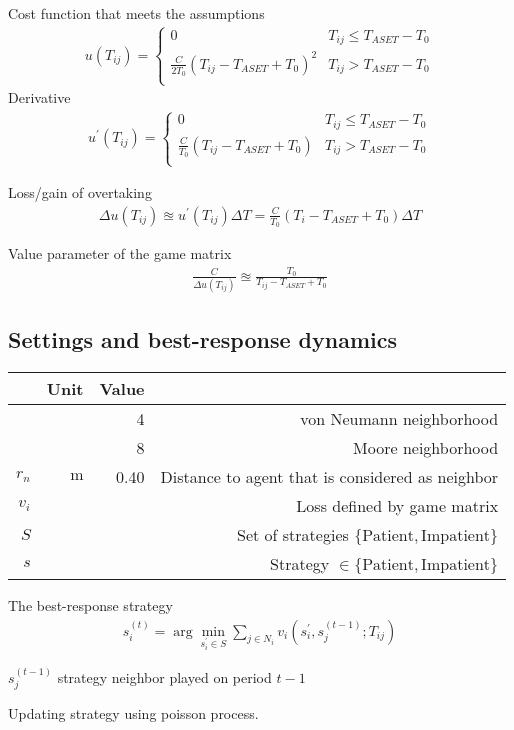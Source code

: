 Cost function that meets the assumptions
\begin{align}
u(T_{ij}) = \begin{cases}
0 & T_{ij} \leq T_{ASET} - T_{0} \\
\frac{C}{2 T_{0}} \left(T_{ij} - T_{ASET} + T_{0}\right)^{2} & T_{ij} > T_{ASET} - T_{0} \\
\end{cases}
\end{align}
Derivative
\begin{align}
u^{\prime}(T_{ij}) = \begin{cases}
0 & T_{ij} \leq T_{ASET} - T_{0} \\
\frac{C}{T_{0}} \left(T_{ij} - T_{ASET} + T_{0}\right) & T_{ij} > T_{ASET} - T_{0} \\
\end{cases}
\end{align}

Loss/gain of overtaking
\begin{align}
\Delta u(T_{ij}) \approxeq u^{\prime}(T_{ij}) \Delta T = \frac{C}{T_{0}} \left(T_{i} - T_{ASET} + T_{0}\right) \Delta T
\end{align}

Value parameter of the game matrix
\begin{align}
\frac{C}{\Delta u(T_{ij})} \approxeq \frac{T_{0}}{T_{ij} - T_{ASET} + T_{0}}
\end{align}

\subsection{Settings and best-response dynamics}
\begin{table}[H]
\begin{tabularx}{1.0\linewidth}{ r r r R }
 & Unit & Value &  \\
\hline
\hline
 & & 4 & von Neumann neighborhood \\
 & & 8 & Moore neighborhood \\
$ r_{n} $ & $ \mathrm{m} $ & 0.40 & Distance to agent that is considered as neighbor \\
$ v_{i} $ & & & Loss defined by game matrix \\
$ S $ &&& Set of strategies $ \{\mathrm{Patient}, \mathrm{Impatient}\} $ \\
$ s $ &&& Strategy $ \in \{\mathrm{Patient}, \mathrm{Impatient}\} $ \\
\end{tabularx}
\end{table}

The best-response strategy
\begin{align}
s_{i}^{(t)} = \arg\min_{s_{i}^{\prime}\in S} \sum_{j\in N_{i}} v_{i} \left(s_{i}^{\prime}, s_{j}^{(t-1)} ; T_{ij} \right)
\end{align}

$ s_{j}^{(t-1)} $ strategy neighbor played on period $ t-1 $

Updating strategy using poisson process.

